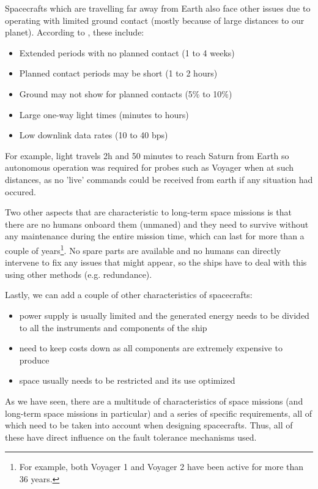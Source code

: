 Spacecrafts which are travelling far away from Earth also face other issues due
to operating with limited ground contact (mostly because of large distances to
our planet). According to \cite{fm-jpl}, these include:
\begin{itemize}
  \item Extended periods with no planned contact (1 to 4 weeks)
  \item Planned contact periods may be short (1 to 2 hours)
  \item Ground may not show for planned contacts (5\% to 10\%)
  \item Large one-way light times (minutes to hours)
  \item Low downlink data rates (10 to 40 bps)
\end{itemize}
For example, light travels 2h and 50 minutes to reach Saturn from Earth so
autonomous operation was required for probes such as Voyager when at such
distances, as no 'live' commands could be received from earth if any situation
had occured.

Two other aspects that are characteristic to long-term space missions is that
there are no humans onboard them (unmaned) and they need to survive without any
maintenance during the entire mission time, which can last for more than a
couple of years\footnote{For example, both Voyager 1 and Voyager 2 have been
active for more than 36 years.}. No spare parts are available and no humans can
directly intervene to fix any issues that might appear, so the ships have to
deal with this using other methods (e.g. redundance).

Lastly, we can add a couple of other characteristics of spacecrafts: 
\begin{itemize}
  \item power supply is usually limited and the generated energy needs to be
  divided to all the instruments and components of the ship
  \item need to keep costs down as all components are extremely expensive to produce
  \item space usually needs to be restricted and its use optimized
\end{itemize}

As we have seen, there are a multitude of characteristics of space missions (and
long-term space missions in particular) and a series of specific requirements,
all of which need to be taken into account when designing spacecrafts. Thus, all
of these have direct influence on the fault tolerance mechanisms used.
